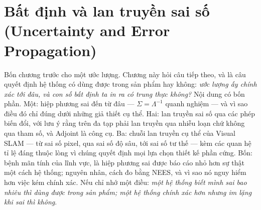 \documentclass[../../vslam.tex]{subfiles}
\begin{document}
\chapter{Bất định và lan truyền sai số (Uncertainty and Error Propagation)}

\begin{tomtat}
Bốn chương trước cho một ước lượng. Chương này hỏi câu tiếp theo, và là câu quyết định hệ thống có dùng được trong sản phẩm hay không: \emph{ước lượng ấy chính xác tới đâu, và con số bất định ta in ra có trung thực không?} Nội dung có bốn phần. Một: hiệp phương sai đến từ đâu --- \(\Sigma = \Lambda^{-1}\) quanh nghiệm --- và vì sao điều đó chỉ đúng dưới những giả thiết cụ thể. Hai: lan truyền sai số qua các phép biến đổi, với lưu ý rằng trên đa tạp phải lan truyền qua nhiễu loạn chứ không qua tham số, và Adjoint là công cụ. Ba: chuỗi lan truyền cụ thể của Visual SLAM --- từ sai số pixel, qua sai số độ sâu, tới sai số tư thế --- kèm các quan hệ tỉ lệ đáng thuộc lòng vì chúng quyết định mọi lựa chọn thiết kế phần cứng. Bốn: bệnh mãn tính của lĩnh vực, là hiệp phương sai được báo cáo nhỏ hơn sự thật một cách hệ thống; nguyên nhân, cách đo bằng NEES, và vì sao nó nguy hiểm hơn việc kém chính xác. Nếu chỉ nhớ một điều: \emph{một hệ thống biết mình sai bao nhiêu thì dùng được trong sản phẩm; một hệ thống chính xác hơn nhưng im lặng khi sai thì không}.
\end{tomtat}
\end{document}
